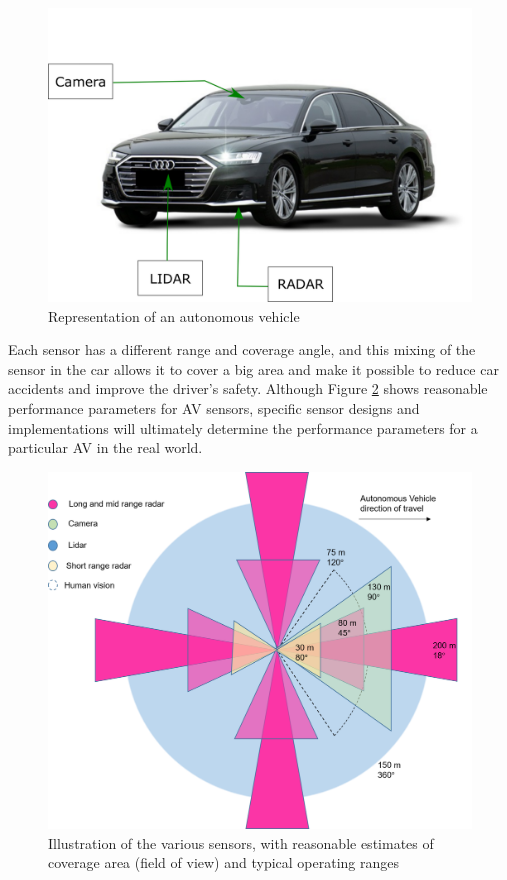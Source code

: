 \begin{figure}[H]
\centering
\includegraphics[scale=0.6]{imagens/image823.png}
\caption{Representation of an autonomous vehicle}
\label{fig:autonomous-vehicles}
\end{figure}


Each sensor has a different range and coverage angle, and this mixing of the sensor in the car allows it to cover a big area and make it possible to reduce car accidents and improve the driver's safety.  Although Figure \ref{fig:sensorsrange} shows reasonable performance parameters for AV sensors, specific sensor designs and implementations will ultimately determine the performance parameters for a particular AV in the real world.


\begin{figure}[H]
\centering
\includegraphics[scale=0.7]{imagens/Imagem1.png}
\caption{Illustration of the various sensors, with reasonable estimates of coverage area (field of view) and typical operating ranges}
\label{fig:sensorsrange}
\end{figure}



